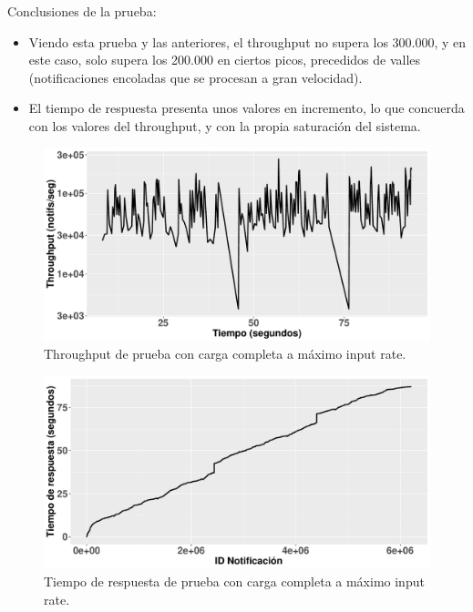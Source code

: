 Conclusiones de la prueba:
\begin{itemize}
    \item Viendo esta prueba y las anteriores, el throughput no supera los
    300.000, y en este caso, solo supera los 200.000 en ciertos picos, precedidos
    de valles (notificaciones encoladas que se procesan a gran velocidad).
    \item El tiempo de respuesta presenta unos valores en incremento, lo que concuerda
    con los valores del throughput, y con la propia saturación del sistema.
\end{itemize}

\begin{figure}[htpb]
    \centering
    \includegraphics[width=\textwidth]{images/full-worklad-inc-msgrate/th_full-workload-inc-msgrate_full.pdf}
    \caption{Throughput de prueba con carga completa a máximo input rate.}
    \label{fig:fullworkload-inc-msgrate-th-full}
\end{figure}

\begin{figure}[htpb]
    \centering
    \includegraphics[width=\textwidth]{images/full-worklad-inc-msgrate/rt_full-workload-inc-msgrate_full.pdf}
    \caption{Tiempo de respuesta de prueba con carga completa a máximo input rate.}
    \label{fig:fullworkload-inc-msgrate-rt-full}
\end{figure}

